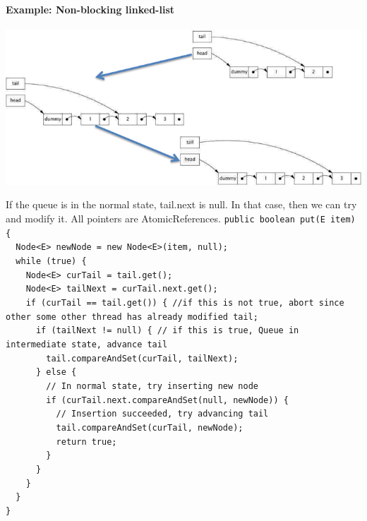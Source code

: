 \documentclass{article}
\begin{document}
\paragraph{Example: Non-blocking linked-list}
\begin{center}
    \includegraphics[scale=0.8]{img/nonblockingll.png}
\end{center}
If the queue is in the normal state, tail.next is null. In that case, then we can try and modify it. All pointers are AtomicReferences.
\lstinline|public boolean put(E item) {|\\
\lstinline|  Node<E> newNode = new Node<E>(item, null);|\\
\lstinline|  while (true) {|\\
\lstinline|    Node<E> curTail = tail.get();|\\
\lstinline|    Node<E> tailNext = curTail.next.get();|\\
\lstinline|    if (curTail == tail.get()) { //if this is not true, abort since other some other thread has already modified tail;|\\
\lstinline|      if (tailNext != null) { // if this is true, Queue in intermediate state, advance tail|\\
\lstinline|        tail.compareAndSet(curTail, tailNext);   |\\
\lstinline|      } else {|\\
\lstinline|        // In normal state, try inserting new node|\\
\lstinline|        if (curTail.next.compareAndSet(null, newNode)) { |\\
\lstinline|          // Insertion succeeded, try advancing tail|\\
\lstinline|          tail.compareAndSet(curTail, newNode);|\\
\lstinline|          return true;|\\
\lstinline|        }|\\
\lstinline|      }|\\
\lstinline|    }|\\
\lstinline|  }|\\
\lstinline|}|
\end{document}
